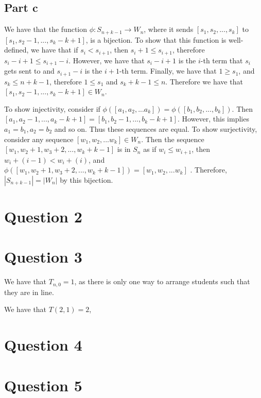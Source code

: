 \documentclass[]{article}
\begin{document}
\subsection{Part c}
We have that the function $\phi: S_{n + k - 1} \rightarrow W_n$, where it sends $[s_1, s_2, ..., s_{k}]$ to $[s_1, s_2 - 1, ..., s_{k} - k + 1]$, is a bijection. 
To show that this function is well-defined, we have that if $s_i < s_{i+1}$, then $s_i + 1 \leq s_{i + 1}$, therefore $s_i - i + 1 \leq s_{i + 1} - i$. However, we have that $s_i - i + 1$ is the $i$-th term that $s_i$ gets sent to and $s_{i + 1} - i$ is the $i + 1$-th term. Finally, we have that $1 \geq s_1$, and $s_k \leq n + k - 1$, therefore $ 1 \leq s_1 $ and $s_k + k - 1 \leq n$. Therefore we have that $[s_1, s_2 - 1, ..., s_{k} - k + 1] \in W_n$. 

To show injectivity, consider if $\phi([a_1, a_2, ... a_k]) = \phi([b_1, b_2, ..., b_k])$. Then $[a_1, a_2 -1, ..., a_k - k + 1] = [b_1, b_2 -1, ..., b_k - k + 1]$. However, this implies $a_1 = b_1, a_2 = b_2$ and so on. Thus these sequences are equal.
To show surjectivity, consider any sequence $[w_1, w_2, ... w_k]\in W_n$. Then the sequence $[w_1, w_2 + 1, w_3 + 2, ..., w_k + k - 1]$ is in $S_n$ as if $w_i \leq w_{i + 1}$, then $w_{i} + (i - 1) < w_i + (i)$, and $\phi([w_1, w_2 + 1, w_3 + 2, ..., w_k + k - 1]) = [w_1, w_2, ... w_k]$ . Therefore, $|S_{n + k - 1}| = |W_n|$ by this bijection. 
\section{Question 2}
\section{Question 3}
We have that $T_{n, 0} = 1$, as there is only one way to arrange students such that they are in line.

We have that $T(2, 1) = 2$, 
\section{Question 4}
\section{Question 5}
\end{document}

